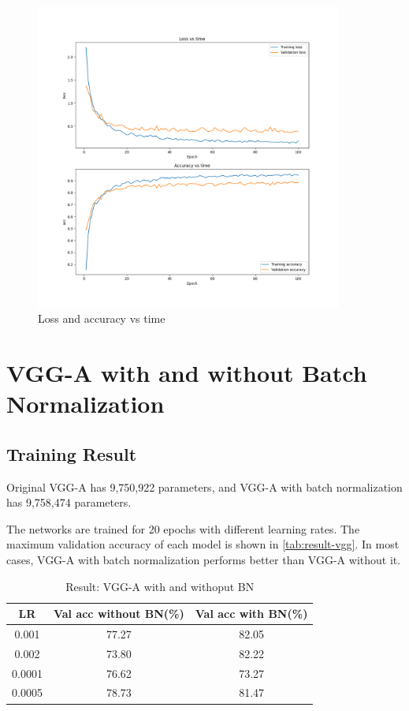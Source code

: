 \documentclass[10pt]{article}
\begin{document}
\begin{figure}[htb]
  \centering
  \includegraphics[width=0.9\textwidth]{figures/resnet34_aug2_lr1e-2_conv1311_batch64_epoch100.png}
  \caption{%
    Loss and accuracy vs time}
  \label{fig:cifar}
\end{figure}

\section{VGG-A with and without Batch Normalization}

\subsection{Training Result}

Original VGG-A has 9,750,922 parameters, and VGG-A with batch normalization has 9,758,474 parameters.

The networks are trained for 20 epochs with different learning rates. The maximum validation accuracy of each model is shown in \autoref{tab:result-vgg}. In most cases, VGG-A with batch normalization performs better than VGG-A without it.


\begin{table}[htb]
\centering
\caption{Result: VGG-A with and withoput BN}
\begin{tabular}{c|c|c}
\hline
\textbf{LR}   & \textbf{Val acc without BN(\%)}   & \textbf{Val acc with BN(\%)}   \\ \hline
0.001   & 77.27 & 82.05 \\
0.002   & 73.80 & 82.22 \\
0.0001  & 76.62 & 73.27 \\
0.0005  & 78.73 & 81.47 \\
\hline
\end{tabular}
\label{tab:result-vgg}
\end{table}
\end{document}
